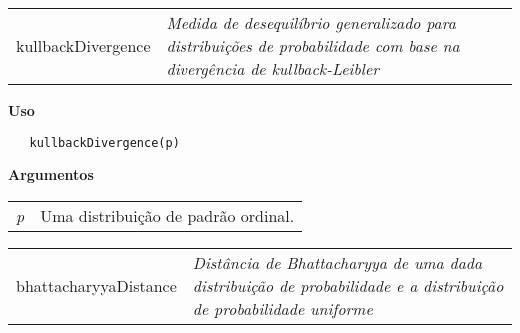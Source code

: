 \hrulefill   

\begin{table}[!ht]
\begin{center}
\begin{tabularx}{\textwidth}{ X X}
\hspace{0.5cm} kullbackDivergence & \textit{Medida de desequilíbrio generalizado para distribuições de probabilidade com base na divergência de kullback-Leibler}\\
\end{tabularx}
\end{center}
\end{table} 

\vspace{-0.5cm}

\hrulefill  

\vspace{0.5cm}

\textbf{Uso}

\begin{lstlisting}
   kullbackDivergence(p)
\end{lstlisting}

\vspace{0.5cm}

\textbf{Argumentos}

\begin{table}[!ht]
\begin{center}
\begin{tabularx}{\textwidth}{X X}
\hspace{0.5cm} \textit{p} & Uma distribuição de padrão ordinal.\\
\end{tabularx}
\end{center}
\end{table} 

\newpage


\hrulefill   

\begin{table}[!ht]
\begin{center}
\begin{tabularx}{\textwidth}{ X X}
\hspace{0.5cm} bhattacharyyaDistance & \textit{Distância de Bhattacharyya de uma dada distribuição de probabilidade e a distribuição de probabilidade uniforme}\\
\end{tabularx}
\end{center}
\end{table} 

